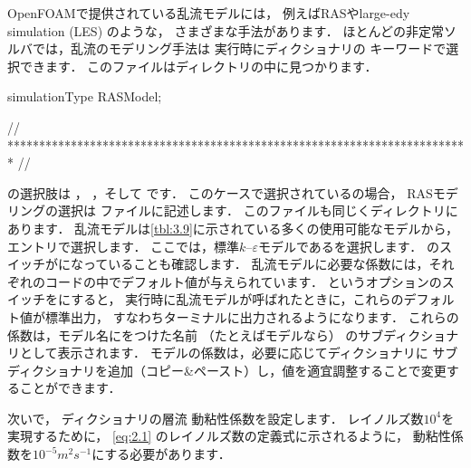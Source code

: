OpenFOAMで提供されている乱流モデルには，
例えばRASやlarge-edy simulation (LES) のような，
さまざまな手法があります．
ほとんどの非定常ソルバでは，乱流のモデリング手法は
実行時にディクショナリの
キーワードで選択できます．
このファイルはディレクトリの中に見つかります．
\begin{OFverbatim}[file, linenum=17]

simulationType  RASModel;


// ************************************************************************* //
\end{OFverbatim}
の選択肢は
%
%
，
%
%
，そして
%
%
です．
このケースで選択されているの場合，
RASモデリングの選択は
%
%
ファイルに記述します．
このファイルも同じくディレクトリにあります．
乱流モデルは\autoref{tbl:3.9}に示されている多くの使用可能なモデルから，
エントリで選択します．
ここでは，標準$k$--$\varepsilon$モデルであるを選択します．
のスイッチがになっていることも確認します．
乱流モデルに必要な係数には，それぞれのコードの中でデフォルト値が与えられています．
%
%
というオプションのスイッチをにすると，
実行時に乱流モデルが呼ばれたときに，これらのデフォルト値が標準出力，
すなわちターミナルに出力されるようになります．
これらの係数は，モデル名にをつけた名前
（たとえばモデルなら）
のサブディクショナリとして表示されます．
モデルの係数は，必要に応じてディクショナリに
サブディクショナリを追加（コピー\&ペースト）し，値を適宜調整することで変更することができます．

次いで，
%
%
ディクショナリの層流
%
動粘性係数を設定します．
レイノルズ数$10^{4}$を実現するために，
\autoref{eq:2.1} のレイノルズ数の定義式に示されるように，
動粘性係数を$10^{-5}\unit{m^{2}s^{-1}}$にする必要があります．

